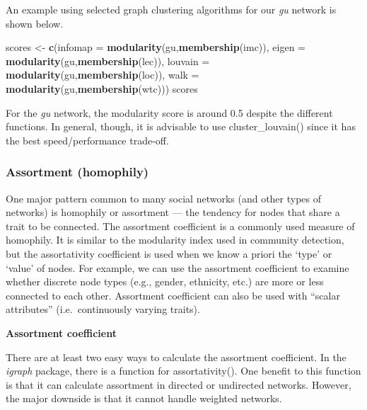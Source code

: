 \documentclass[
]{article}
\newenvironment{Shaded}{\begin{snugshade}}{\end{snugshade}}
\newcommand{\AttributeTok}[1]{\textcolor[rgb]{0.13,0.29,0.53}{#1}}
\newcommand{\FunctionTok}[1]{\textcolor[rgb]{0.13,0.29,0.53}{\textbf{#1}}}
\newcommand{\NormalTok}[1]{#1}
\newcommand{\OtherTok}[1]{\textcolor[rgb]{0.56,0.35,0.01}{#1}}
\begin{document}
\normalsize

An example using selected graph clustering algorithms for our \emph{gu} network is shown below.

\footnotesize

\begin{Shaded}
\begin{Highlighting}[]
\NormalTok{scores }\OtherTok{\textless{}{-}} \FunctionTok{c}\NormalTok{(}\AttributeTok{infomap =} \FunctionTok{modularity}\NormalTok{(gu,}\FunctionTok{membership}\NormalTok{(imc)),}
            \AttributeTok{eigen =} \FunctionTok{modularity}\NormalTok{(gu,}\FunctionTok{membership}\NormalTok{(lec)),}
            \AttributeTok{louvain =} \FunctionTok{modularity}\NormalTok{(gu,}\FunctionTok{membership}\NormalTok{(loc)),}
            \AttributeTok{walk =} \FunctionTok{modularity}\NormalTok{(gu,}\FunctionTok{membership}\NormalTok{(wtc)))}
\NormalTok{scores}
\end{Highlighting}
\end{Shaded}

\normalsize

For the \emph{gu} network, the modularity score is around 0.5 despite the different functions. In general, though, it is advisable to use cluster\_louvain() since it has the best speed/performance trade-off.

\hypertarget{assortment-homophily}{%
\subsubsection{Assortment (homophily)}\label{assortment-homophily}}

One major pattern common to many social networks (and other types of networks) is homophily or assortment --- the tendency for nodes that share a trait to be connected. The assortment coefficient is a commonly used measure of homophily. It is similar to the modularity index used in community detection, but the assortativity coefficient is used when we know a priori the `type' or `value' of nodes. For example, we can use the assortment coefficient to examine whether discrete node types (e.g., gender, ethnicity, etc.) are more or less connected to each other. Assortment coefficient can also be used with ``scalar attributes'' (i.e.~continuously varying traits).

\textbf{Assortment coefficient}

There are at least two easy ways to calculate the assortment coefficient. In the \emph{igraph} package, there is a function for assortativity(). One benefit to this function is that it can calculate assortment in directed or undirected networks. However, the major downside is that it cannot handle weighted networks.
\end{document}
